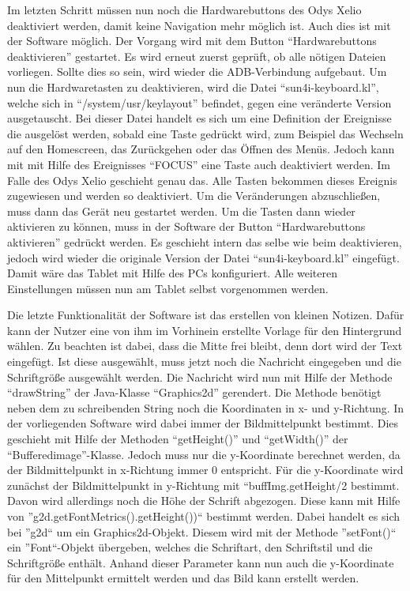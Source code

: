 \begin{flushleft}
Im letzten Schritt müssen nun noch die Hardwarebuttons des Odys Xelio deaktiviert werden, damit keine Navigation mehr möglich ist. Auch dies ist mit der Software möglich. Der Vorgang wird mit dem Button ``Hardwarebuttons deaktivieren'' gestartet. Es wird erneut zuerst geprüft, ob alle nötigen Dateien vorliegen. Sollte dies so sein, wird wieder die ADB-Verbindung aufgebaut. Um nun die Hardwaretasten zu deaktivieren, wird die Datei ``sun4i-keyboard.kl'', welche sich in ``/system/usr/keylayout'' befindet, gegen eine veränderte Version ausgetauscht. Bei dieser Datei handelt es sich um eine Definition der Ereignisse die ausgelöst werden, sobald eine Taste gedrückt wird, zum Beispiel das Wechseln auf den Homescreen, das Zurückgehen oder das Öffnen des Menüs. Jedoch kann mit mit Hilfe des Ereignisses ``FOCUS'' eine Taste auch deaktiviert werden. Im Falle des Odys Xelio geschieht genau das. Alle Tasten bekommen dieses Ereignis zugewiesen und werden so deaktiviert. Um die Veränderungen abzuschließen, muss dann das Gerät neu gestartet werden. Um die Tasten dann wieder aktivieren zu können, muss in der Software der Button ``Hardwarebuttons aktivieren'' gedrückt werden. Es geschieht intern das selbe wie beim deaktivieren, jedoch wird wieder die originale Version der Datei ``sun4i-keyboard.kl'' eingefügt. 
Damit wäre das Tablet mit Hilfe des PCs konfiguriert. Alle weiteren Einstellungen müssen nun am Tablet selbst vorgenommen werden.

Die letzte Funktionalität der Software ist das erstellen von kleinen Notizen. Dafür kann der Nutzer eine von ihm im Vorhinein erstellte Vorlage für den Hintergrund wählen. Zu beachten ist dabei, dass die Mitte frei bleibt, denn dort wird der Text eingefügt. Ist diese ausgewählt, muss jetzt noch die Nachricht eingegeben und die Schriftgröße ausgewählt werden. Die Nachricht wird nun mit Hilfe der Methode ``drawString'' der Java-Klasse ``Graphics2d'' gerendert. Die Methode benötigt neben dem zu schreibenden String noch die Koordinaten in x- und y-Richtung. In der vorliegenden Software wird dabei immer der Bildmittelpunkt bestimmt. Dies geschieht mit Hilfe der Methoden ``getHeight()'' und ``getWidth()'' der ``Bufferedimage''-Klasse. Jedoch muss nur die y-Koordinate berechnet werden, da der Bildmittelpunkt in x-Richtung immer 0 entspricht. Für die y-Koordinate wird zunächst der Bildmittelpunkt in y-Richtung mit ``buffImg.getHeight/2 bestimmt.
Davon wird allerdings noch die Höhe der Schrift abgezogen. Diese kann mit Hilfe von ''g2d.getFontMetrics().getHeight())`` bestimmt werden. Dabei handelt es sich bei ''g2d`` um ein Graphics2d-Objekt. Diesem wird mit der Methode ''setFont()`` ein ''Font``-Objekt übergeben, welches die Schriftart, den Schriftstil und die Schriftgröße enthält. Anhand dieser Parameter kann nun auch die y-Koordinate für den Mittelpunkt ermittelt werden und das Bild kann erstellt werden. 

\end{flushleft}